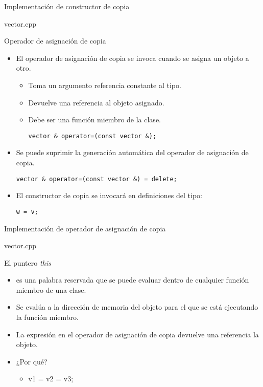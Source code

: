 \begin{frame}{Implementación de constructor de copia}
\begin{block}{vector.cpp}

\end{block}
\end{frame}

\begin{frame}[fragile]{Operador de asignación de copia}
\begin{itemize}
  \item El \alert{operador de asignación de copia} se invoca cuando se asigna un objeto a otro.
    \begin{itemize}
      \item Toma un argumento referencia constante al tipo.
      \item Devuelve una referencia al objeto asignado.
      \item Debe ser una función miembro de la clase.
\begin{lstlisting}
vector & operator=(const vector &);
\end{lstlisting}
    \end{itemize}
  \item Se puede suprimir la generación automática del operador de asignación de copia.
\begin{lstlisting}
vector & operator=(const vector &) = delete;
\end{lstlisting}
  \item El constructor de copia se invocará en definiciones del tipo:
\begin{lstlisting}
w = v;
\end{lstlisting}
\end{itemize}
\end{frame}

\begin{frame}{Implementación de operador de asignación de copia}
\begin{block}{vector.cpp}

\end{block}
\end{frame}

\begin{frame}{El puntero \emph{this}}
\begin{itemize}
  \item {} es una palabra reservada que se puede evaluar dentro de cualquier función miembro de una clase.
  \item Se evalúa a la dirección de memoria del objeto para el que se está ejecutando la función miembro.
  \item La expresión  en el operador de asignación de copia devuelve una referencia la objeto.
  \item ¿Por qué?
    \begin{itemize}
      \item v1 = v2 = v3;
    \end{itemize}
\end{itemize}
\end{frame}


